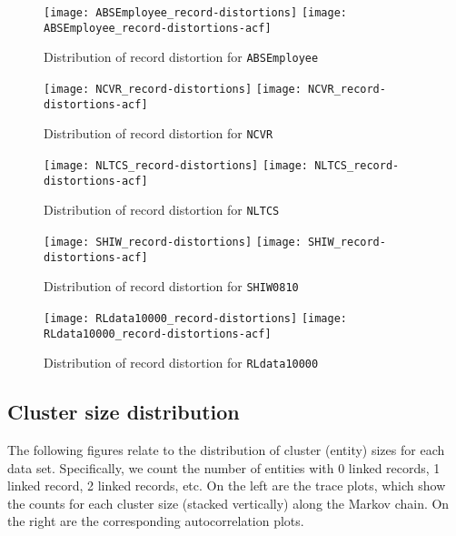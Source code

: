 \documentclass[12pt,letterpaper]{article}
\newcommand{\1}[1]{\mathbb{I}\!\left[#1\right]} %
\begin{document}
\begin{figure}[H]
  \texttt{[image: ABSEmployee\_record-distortions]} \hfill
  \texttt{[image: ABSEmployee\_record-distortions-acf]}
  \caption{Distribution of record distortion for \texttt{ABSEmployee}}
\end{figure}
\begin{figure}[H]
  \texttt{[image: NCVR\_record-distortions]} \hfill
  \texttt{[image: NCVR\_record-distortions-acf]}
  \caption{Distribution of record distortion for \texttt{NCVR}}
\end{figure}
\begin{figure}[H]
  \texttt{[image: NLTCS\_record-distortions]} \hfill
  \texttt{[image: NLTCS\_record-distortions-acf]}
  \caption{Distribution of record distortion for \texttt{NLTCS}}
\end{figure}
\begin{figure}[H]
  \texttt{[image: SHIW\_record-distortions]} \hfill
  \texttt{[image: SHIW\_record-distortions-acf]}
  \caption{Distribution of record distortion for \texttt{SHIW0810}}
\end{figure}
\begin{figure}[H]
  \texttt{[image: RLdata10000\_record-distortions]} \hfill
  \texttt{[image: RLdata10000\_record-distortions-acf]}
  \caption{Distribution of record distortion for \texttt{RLdata10000}}
\end{figure}

\subsection{Cluster size distribution}
The following figures relate to the distribution of cluster (entity) sizes 
for each data set.
Specifically, we count the number of entities with 0 linked records, 
1 linked record, 2 linked records, etc.
On the left are the trace plots, which show the counts for each cluster size 
(stacked vertically) along the Markov chain.
On the right are the corresponding autocorrelation plots.
\end{document}
